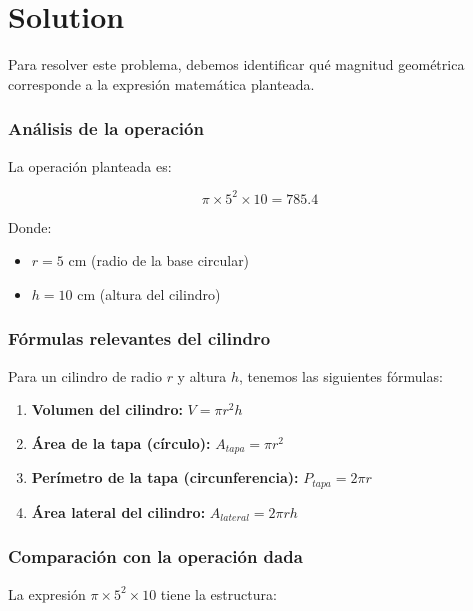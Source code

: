 \documentclass[
]{article}
\providecommand{\tightlist}{%
  \setlength{\itemsep}{0pt}\setlength{\parskip}{0pt}}
\begin{document}
\section{Solution}\label{solution}

Para resolver este problema, debemos identificar qué magnitud geométrica
corresponde a la expresión matemática planteada.

\subsubsection{Análisis de la
operación}\label{anuxe1lisis-de-la-operaciuxf3n}

La operación planteada es:

\[\pi \times 5^2 \times 10 = 785.4\]

Donde:

\begin{itemize}
\tightlist
\item
  \(r = 5\) cm (radio de la base circular)
\item
  \(h = 10\) cm (altura del cilindro)
\end{itemize}

\subsubsection{Fórmulas relevantes del
cilindro}\label{fuxf3rmulas-relevantes-del-cilindro}

Para un cilindro de radio \(r\) y altura \(h\), tenemos las siguientes
fórmulas:

\begin{enumerate}
\def\labelenumi{\arabic{enumi}.}
\tightlist
\item
  \textbf{Volumen del cilindro:} \(V = \pi r^2 h\)
\item
  \textbf{Área de la tapa (círculo):} \(A_{tapa} = \pi r^2\)
\item
  \textbf{Perímetro de la tapa (circunferencia):} \(P_{tapa} = 2\pi r\)
\item
  \textbf{Área lateral del cilindro:} \(A_{lateral} = 2\pi r h\)
\end{enumerate}

\subsubsection{Comparación con la operación
dada}\label{comparaciuxf3n-con-la-operaciuxf3n-dada}

La expresión \(\pi \times 5^2 \times 10\) tiene la estructura:
\end{document}
